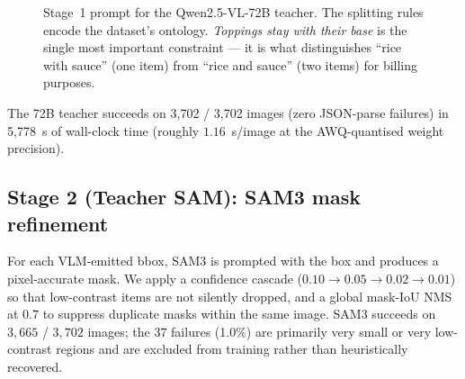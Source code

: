 \begin{figure}[t]
\centering
{}
\caption{Stage~1 prompt for the Qwen2.5-VL-72B teacher. The splitting rules
encode the dataset's ontology. \emph{Toppings stay with their base} is the
single most important constraint --- it is what distinguishes ``rice with sauce''
(one item) from ``rice and sauce'' (two items) for billing purposes.}
\label{fig:prompt-template}
\end{figure}

The 72B teacher succeeds on 3{,}702 / 3{,}702 images (zero JSON-parse failures)
in 5{,}778~s of wall-clock time (roughly $1.16$~s/image at the AWQ-quantised
weight precision).

\subsection{Stage 2 (Teacher SAM): SAM3 mask refinement}
\label{sec:de:sam}

For each VLM-emitted bbox, SAM3 is prompted with the box and produces a
pixel-accurate mask. We apply a confidence cascade
($0.10 \rightarrow 0.05 \rightarrow 0.02 \rightarrow 0.01$) so that
low-contrast items are not silently dropped, and a global mask-IoU NMS at
$0.7$ to suppress duplicate masks within the same image. SAM3 succeeds on
$3{,}665$ / $3{,}702$ images; the $37$ failures (1.0\%) are primarily very
small or very low-contrast regions and are excluded from training rather than
heuristically recovered.

